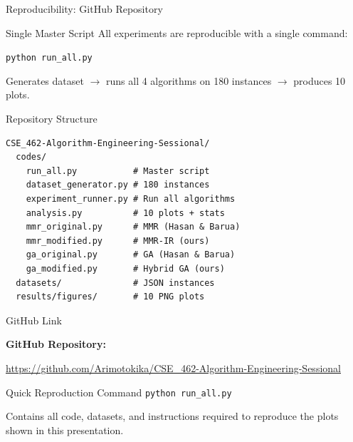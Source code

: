 \documentclass[aspectratio=169,10pt]{beamer}
\begin{document}
\begin{frame}[fragile]{Reproducibility: GitHub Repository}
  \begin{block}{Single Master Script}
    All experiments are reproducible with a single command:
    \begin{center}
      \texttt{python run\_all.py}
    \end{center}
    Generates dataset $\rightarrow$ runs all 4 algorithms on 180 instances $\rightarrow$ produces 10 plots.
  \end{block}

  \vspace{0.1cm}

  \begin{exampleblock}{Repository Structure}
\scriptsize
\begin{verbatim}
CSE_462-Algorithm-Engineering-Sessional/
  codes/
    run_all.py           # Master script
    dataset_generator.py # 180 instances
    experiment_runner.py # Run all algorithms
    analysis.py          # 10 plots + stats
    mmr_original.py      # MMR (Hasan & Barua)
    mmr_modified.py      # MMR-IR (ours)
    ga_original.py       # GA (Hasan & Barua)
    ga_modified.py       # Hybrid GA (ours)
  datasets/              # JSON instances
  results/figures/       # 10 PNG plots
\end{verbatim}
  \end{exampleblock}
\end{frame}

\begin{frame}{GitHub Link}
  \begin{center}
    \vspace{0.8cm}
    {\Large\textbf{GitHub Repository:}}

    \vspace{0.4cm}
    {\large\url{https://github.com/Arimotokika/CSE_462-Algorithm-Engineering-Sessional}}

    \vspace{0.8cm}
    \begin{block}{Quick Reproduction Command}
      \small
      \texttt{python run\_all.py}
    \end{block}

    \vspace{0.25cm}
    {\scriptsize Contains all code, datasets, and instructions required to reproduce the plots shown in this presentation.}
  \end{center}
\end{frame}
\end{document}
